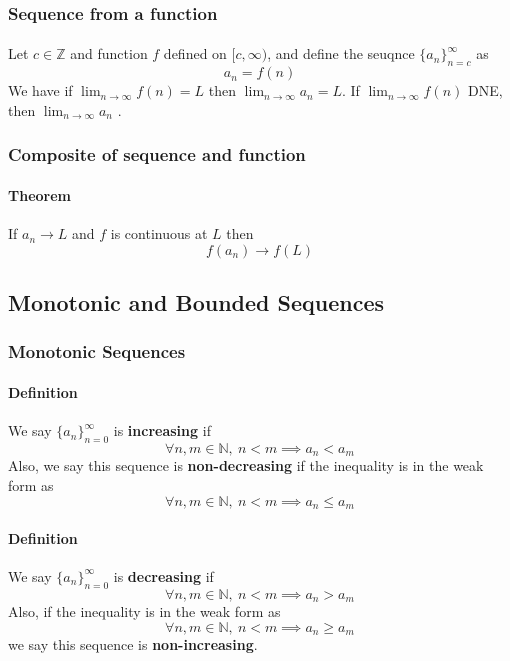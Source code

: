 \documentclass{article}
\begin{document}
\subsubsection{Sequence from a function}
\paragraph{} Let $c \in \mathbb{Z}$ and function $f$ defined on $[c,\infty)$, and define the seuqnce $\{a_n\}_{n=c}^{\infty}$ as
\[
	a_n = f(n)
\]
We have if $\lim_{n \to \infty}f(n) = L$ then $\lim_{n \to \infty}a_n = L$. If $\lim_{n \to \infty}f(n)$ DNE, then $\lim_{n \to \infty}a_n$ .

\subsubsection{Composite of sequence and function}
\paragraph{Theorem} If $a_n \to L$ and $f$ is continuous at $L$ then 
\[
	f(a_n) \to f(L)
\]

\subsection{Monotonic and Bounded Sequences}
\subsubsection{Monotonic Sequences}
\paragraph{Definition} We say $\{a_n\}_{n=0}^{\infty}$ is \textbf{increasing} if 
\[
	\forall n,m \in \mathbb{N},\ n<m \implies a_n < a_m
\]
Also, we say this sequence is \textbf{non-decreasing} if the inequality is in the weak form as
\[
	\forall n,m \in \mathbb{N},\ n<m \implies a_n \leq a_m
\]

\paragraph{Definition} We say $\{a_n\}_{n=0}^{\infty}$ is \textbf{decreasing} if 
\[
	\forall n,m \in \mathbb{N},\ n<m \implies a_n > a_m
\]
Also, if the inequality is in the weak form as
\[
	\forall n,m \in \mathbb{N},\ n<m \implies a_n \geq a_m
\]
we say this sequence is \textbf{non-increasing}.
\end{document}

